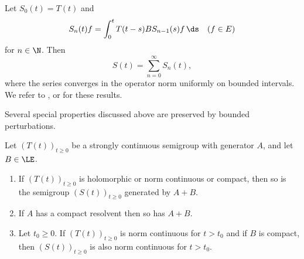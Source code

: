 Let $S_{0}(t) = T(t)$ and
\begin{equation}\label{eq:a2-1.10}
    S_{n}(t)f = \int_{0}^{t} T(t-s)BS_{n-1}(s)f\, \ds \quad (f \in E)
\end{equation}
for $n \in \N$. Then
\begin{equation}\label{eq:a2-1.11}
    S(t) = \sum_{n=0}^{\infty} S_{n}(t),
\end{equation}
where the series converges in the operator norm uniformly on bounded intervals.
We refer to \textcite[III.1]{davies:1980}, \textcite[I.6]{goldstein:1985a} or \textcite[Chapter 3]{pazy:1983} for these results.

Several special properties discussed above are preserved by bounded perturbations.

\begin{theorem} \label{thm:a2-1.30}
Let $(T(t))_{t \geq 0}$ be a strongly continuous semigroup with generator $A$, and let $B \in \LE$.

\begin{enumerate}[\upshape(i)]
\item
If\/ $(T(t))_{t \geq 0}$ is holomorphic or norm continuous or compact, then so is the semigroup 
$(S(t))_{t \geq 0}$ 
generated by $A+B$.

\item
If\/ $A$ has a compact resolvent then so has $A+B$.

\item
Let $t_{0} \geq 0$.
If\/ $(T(t))_{t \geq 0}$ is norm continuous for $t > t_{0}$ and if 
$B$ is compact, then $(S(t))_{t \geq 0}$ is also norm continuous for $t > t_{0}$.

\end{enumerate}

\end{theorem}
